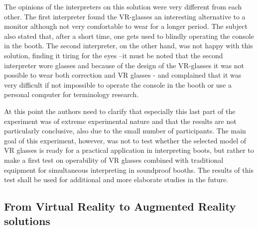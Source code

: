 \documentclass[output=paper]{langsci/langscibook}
\begin{document}
The opinions of the interpreters on this solution were very different from each other. The first interpreter found the VR-glasses an interesting alternative to a monitor although not very comfortable to wear for a longer period. The subject also stated that, after a short time, one gets used to blindly operating the console in the booth. The second interpreter, on the other hand, was not happy with this solution, finding it tiring for the eyes –it must be noted that the second interpreter wore glasses and because of the design of the VR-glasses it was not possible to wear both correction and VR glasses - and complained that it was very difficult if not impossible to operate the console in the booth or use a personal computer for terminology research.

At this point the authors need to clarify that especially this last part of the experiment was of extreme experimental nature and that the results are not particularly conclusive, also due to the small number of participants. The main goal of this experiment, however, was not to test whether the selected model of VR glasses is ready for a practical application in interpreting boots, but rather to make a first test on operability of VR glasses combined with traditional equipment for simultaneous interpreting in soundproof booths. The results of this test shall be used for additional and more elaborate studies in the future.

\subsection{From Virtual Reality to Augmented Reality solutions}
\end{document}
